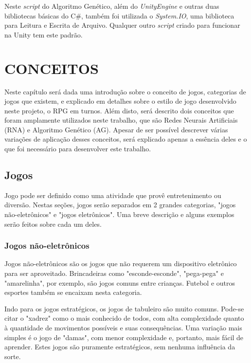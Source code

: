 \documentclass[
	12pt,					%
	openright,				%
	oneside,				%
	a4paper,				%
	bibjustif,				%
	chapter=TITLE,			%
	english,				%
	brazil,					%
	]{abntex2}
\begin{document}
		Neste \textit{script} do Algoritmo Genético, além do \textit{UnityEngine} e outras duas bibliotecas básicas do C\#,
		também foi utilizada o \textit{System.IO}, uma biblioteca para Leitura e Escrita de Arquivo.
		Qualquer outro \textit{script} criado para funcionar na Unity tem este padrão.

\FloatBarrier
\newpage %
\chapter{CONCEITOS}

	Neste capítulo será dada uma introdução sobre o conceito de jogos,
	categorias de jogos que existem,
	e explicado em detalhes sobre o estilo de jogo desenvolvido neste projeto,
	o RPG em turnos.
	Além disto, será descrito dois conceitos que foram amplamente utilizados neste trabalho,
	que são Redes Neurais Artificiais (RNA) e Algoritmo Genético (AG).
	Apesar de ser possível descrever várias variações de aplicação desses conceitos,
	será explicado apenas a essência deles e o que foi necessário para desenvolver este trabalho.
	
	\FloatBarrier
	\section{Jogos}
	Jogo pode ser definido como uma atividade que provê entretenimento ou diversão{}.
	Nestas seções, jogos serão separados em 2 grandes categorias,
	"jogos não-eletrônicos"{} e "jogos eletrônicos"{}.
	Uma breve descrição e alguns exemplos serão feitos sobre cada um deles.
	
		\FloatBarrier
		\subsection{Jogos não-eletrônicos} \label{ssec:notElectronicGame}
		Jogos não-eletrônicos são os jogos que não requerem um dispositivo eletrônico para ser aproveitado.
		Brincadeiras como "esconde-esconde"{}, "pega-pega"{} e "amarelinha"{}, por exemplo,
		são jogos comuns entre crianças.
		Futebol e outros esportes também se encaixam nesta categoria.
		
		Indo para os jogos estratégicos,
		os jogos de tabuleiro são muito comuns.
		Pode-se citar o "xadrez"{} como o mais conhecido de todos,
		com alta complexidade quanto à quantidade de movimentos possíveis e suas consequências.
		Uma variação mais simples é o jogo de "damas"{},
		com menor complexidade e, portanto, mais fácil de aprender.
		Estes jogos são puramente estratégicos,
		sem nenhuma influência da sorte.
		
\end{document}

